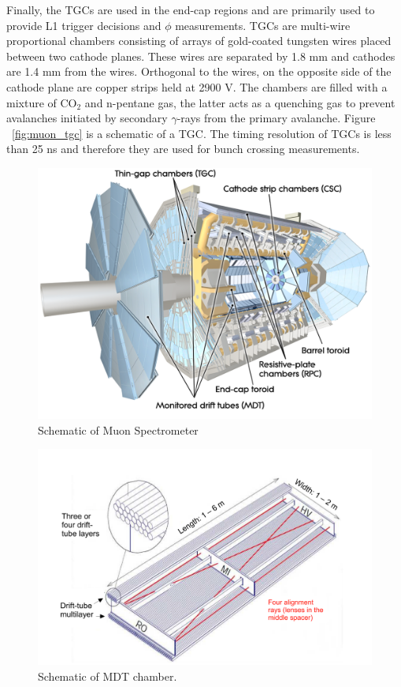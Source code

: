 Finally, the TGCs are used in the end-cap regions and are primarily used to provide L1 trigger decisions and $\phi$ measurements. TGCs are multi-wire proportional chambers consisting of arrays of gold-coated tungsten wires placed between two cathode planes. These wires are separated by 1.8 mm and cathodes are 1.4 mm from the wires. Orthogonal to the wires, on the opposite side of the cathode plane are copper strips held at 2900 V. The chambers are filled with a mixture of CO$_{2}$ and n-pentane gas, the latter acts as a quenching gas to prevent avalanches initiated by secondary $\gamma$-rays from the primary avalanche. Figure ~\ref{fig:muon_tgc} is a schematic of a TGC. The timing resolution of TGCs is less than 25 ns and therefore they are used for bunch crossing measurements. 

\begin{figure}[h!]
  \centering
  \includegraphics[width=\hsize]{figures/Detector/muonsys.pdf}
  \caption{Schematic of Muon Spectrometer \cite{atlas_detector}} 
  \label{fig:muonsys}
\end{figure}
\FloatBarrier


\begin{figure}[h!]
  \centering
  \includegraphics[width=\hsize]{figures/Detector/muon_mdt.pdf}
  \caption{Schematic of MDT chamber.} 
  \label{fig:muon_mdt}
\end{figure}
\FloatBarrier


